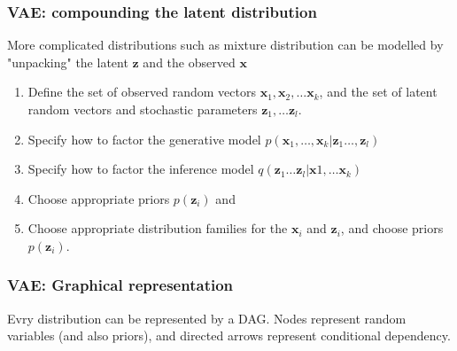 \documentclass[final]{beamer}
\newcommand{\x}{\mathbf{x}}
\newcommand{\z}{\mathbf{z}}
\begin{document}
\begin{frame}
\frametitle{VAE: compounding the latent distribution}
More complicated distributions such as mixture distribution
can be modelled by "unpacking" the latent $\z$ and the observed $\x$
\label{VAE-specs}
\begin{enumerate}
\item{} Define the set of observed random vectors $\x_1, \x_2, \dots \x_k$, and 
the set of latent random vectors and stochastic parameters $\z_1, \dots \z_l$.
\item{} Specify how to factor the generative model $p(\x_1,\dots, \x_k| \z_1
\dots , \z_l)$
\item{} Specify how to factor the inference model $q(\z_1 \dots \z_l | \x1,
\dots \x_k)$
\item{} Choose appropriate priors $p(\z_i)$ and
\item{} Choose appropriate distribution families for the $\x_i$ and $\z_i$,
and choose priors $p(\z_i)$.
\end{enumerate}

\end{frame}

\begin{frame}
\frametitle{VAE: Graphical representation}
Evry distribution can be represented by a DAG. Nodes represent random variables
(and also priors), and directed arrows represent conditional dependency.

\end{frame}
\end{document}
